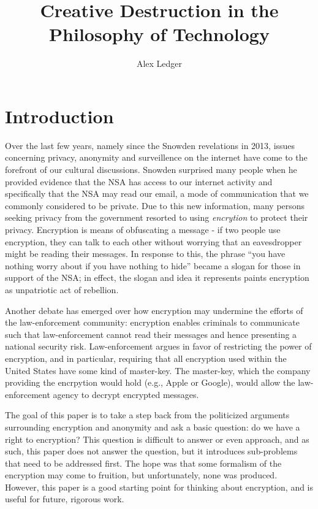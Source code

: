 \documentclass[11pt]{article}
\title{Creative Destruction in the Philosophy of Technology}
\author{Alex Ledger}
\date{}
\begin{document}
\doublespacing


\maketitle

\section{Introduction}
Over the last few years, namely since the Snowden revelations in 2013, issues concerning privacy, anonymity and surveillence on the internet have come to the forefront of our cultural discussions.
Snowden surprised many people when he provided evidence that the NSA has access to our internet activity and specifically that the NSA may read our email, a mode of communication that we commonly considered to be private.
Due to this new information, many persons seeking privacy from the government resorted to using \textit{encrytion} to protect their privacy.
Encryption is means of obfuscating a message - if two people use encryption, they can talk to each other without worrying that an eavesdropper might be reading their messages.
In response to this, the phrase ``you have nothing worry about if you have nothing to hide'' became a slogan for those in support of the NSA; in effect, the slogan and idea it represents paints encryption as unpatriotic act of rebellion.

Another debate has emerged over how encryption may undermine the efforts of the law-enforcement community: encryption enables criminals to communicate such that law-enforcement cannot read their messages and hence presenting a national security risk.
Law-enforcement argues in favor of restricting the power of encryption, and in particular, requiring that all encryption used within the United States have some kind of master-key.
The master-key, which the company providing the encrpytion would hold (e.g., Apple or Google), would allow the law-enforcement agency to decrypt encrypted messages.

The goal of this paper is to take a step back from the politicized arguments surrounding encryption and anonymity and ask a basic question: do we have a right to encryption?
This question is difficult to answer or even approach, and as such, this paper does not answer the question, but it introduces sub-problems that need to be addressed first.
The hope was that some formalism of the encryption may come to fruition, but unfortunately, none was produced.
However, this paper is a good starting point for thinking about encryption, and is useful for future, rigorous work.
\end{document}
